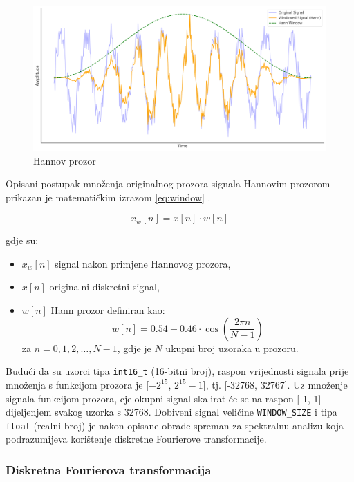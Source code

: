\begin{figure}[htb]
    \centering
    \includegraphics[width=0.85\linewidth]{Chapters/struktura_sustava/generiranje_znacajki/hann.png} 
    \caption{Hannov prozor}
    \label{pic:hann}
\end{figure}

Opisani postupak množenja originalnog prozora signala Hannovim prozorom prikazan je 
matematičkim izrazom \eqref{eq:window} .

\begin{equation}
    x_w[n] = x[n] \cdot w[n]
    \label{eq:window}
\end{equation}

gdje su:
\begin{itemize}
    \item \( x_w[n] \) signal nakon primjene Hannovog prozora,
    \item \( x[n] \) originalni diskretni signal,
    \item \( w[n] \) Hann prozor definiran kao:
    \begin{equation}
        w[n] = 0.54 - 0.46 \cdot \cos\left( \frac{2 \pi n}{N-1} \right)
    \end{equation}
    za \( n = 0, 1, 2, \dots, N-1 \),
    gdje je \( N \) ukupni broj uzoraka u prozoru.
\end{itemize}

Budući da su uzorci tipa \texttt{int16\_t} (16-bitni broj), raspon vrijednosti signala 
prije množenja s funkcijom prozora je [$-2^{15}$, $2^{15} - 1$], tj. [-32768, 32767]. Uz množenje
signala funkcijom prozora, cjelokupni signal skalirat će se na raspon [-1, 1] dijeljenjem svakog
uzorka s 32768. Dobiveni signal veličine \texttt{WINDOW\_SIZE} i tipa \texttt{float} (realni broj) je nakon
opisane obrade spreman za spektralnu analizu koja podrazumijeva korištenje diskretne Fourierove
transformacije.

\subsubsection{Diskretna Fourierova transformacija}
\label{sec:fft}

